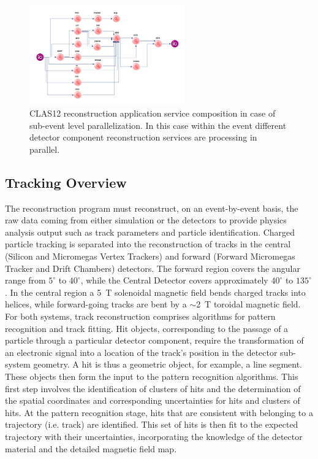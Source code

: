 \documentclass[3p,times,twocolumn]{elsarticle}
\begin{document}
\begin{figure}
\includegraphics[width=0.6\textwidth,natwidth=610,natheight=642]{pics/ServiceComposition.png}
\caption{CLAS12 reconstruction application service composition in case of sub-event level parallelization.
In this case within the event different detector component reconstruction services are processing in parallel.}
\label{fig:services}
\end{figure}



\subsection{Tracking Overview}
The reconstruction program must reconstruct, on an event-by-event basis, the raw data coming from either
simulation or the detectors to provide physics analysis output such as track parameters and particle
identification. Charged particle tracking is separated into the reconstruction of tracks in the central
(Silicon and Micromegas Vertex Trackers) and forward (Forward Micromegas Tracker and Drift
Chambers) detectors. The forward region covers the angular range from $5^\circ$ to $40^\circ$, while
the Central Detector covers approximately $40^\circ$ to $135^\circ$. In the central region a 5~T
solenoidal magnetic field bends charged tracks into helices, while forward-going tracks are bent by a
$\sim$2~T toroidal magnetic field. For both systems, track reconstruction comprises algorithms for
pattern recognition and track fitting. Hit objects, corresponding to the passage of a particle through a
particular detector component, require the transformation of an electronic signal into a location of the
track's position in the detector sub-system geometry. A hit is thus a geometric object, for example, a
line segment. These objects then form the input to the pattern recognition algorithms. This first step
involves the identification of clusters of hits and the determination of the spatial coordinates and
corresponding uncertainties for hits and clusters of hits. At the pattern recognition stage, hits that are
consistent with belonging to a trajectory (i.e. track) are identified. This set of hits is then fit to the
expected trajectory with their uncertainties, incorporating the knowledge of the detector material and
the detailed magnetic field map.
\end{document}
